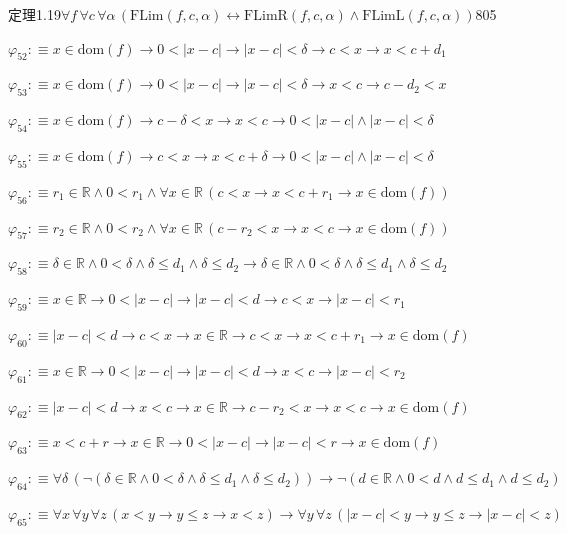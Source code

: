 \begin{fullproof}{定理1.19}{$\forall f\,\forall c\,\forall \alpha\,(\mathrm{FLim}(f,c,\alpha) \leftrightarrow \mathrm{FLimR}(f,c,\alpha) \land \mathrm{FLimL}(f,c,\alpha))$}{805}
\begin{abbrevlist}
\item $\varphi_{52} :\equiv x \in \mathrm{dom}(f) \to 0 < \lvert x - c \rvert \to \lvert x - c \rvert < \delta \to c < x \to x < c + d_{1}$
\item $\varphi_{53} :\equiv x \in \mathrm{dom}(f) \to 0 < \lvert x - c \rvert \to \lvert x - c \rvert < \delta \to x < c \to c - d_{2} < x$
\item $\varphi_{54} :\equiv x \in \mathrm{dom}(f) \to c - \delta < x \to x < c \to 0 < \lvert x - c \rvert \land \lvert x - c \rvert < \delta$
\item $\varphi_{55} :\equiv x \in \mathrm{dom}(f) \to c < x \to x < c + \delta \to 0 < \lvert x - c \rvert \land \lvert x - c \rvert < \delta$
\item $\varphi_{56} :\equiv r_{1} \in \mathbb{R} \land 0 < r_{1} \land \forall x \in \mathbb{R}\,(c < x \to x < c + r_{1} \to x \in \mathrm{dom}(f))$
\item $\varphi_{57} :\equiv r_{2} \in \mathbb{R} \land 0 < r_{2} \land \forall x \in \mathbb{R}\,(c - r_{2} < x \to x < c \to x \in \mathrm{dom}(f))$
\item $\varphi_{58} :\equiv \delta \in \mathbb{R} \land 0 < \delta \land \delta \leq d_{1} \land \delta \leq d_{2} \to \delta \in \mathbb{R} \land 0 < \delta \land \delta \leq d_{1} \land \delta \leq d_{2}$
\item $\varphi_{59} :\equiv x \in \mathbb{R} \to 0 < \lvert x - c \rvert \to \lvert x - c \rvert < d \to c < x \to \lvert x - c \rvert < r_{1}$
\item $\varphi_{60} :\equiv \lvert x - c \rvert < d \to c < x \to x \in \mathbb{R} \to c < x \to x < c + r_{1} \to x \in \mathrm{dom}(f)$
\item $\varphi_{61} :\equiv x \in \mathbb{R} \to 0 < \lvert x - c \rvert \to \lvert x - c \rvert < d \to x < c \to \lvert x - c \rvert < r_{2}$
\item $\varphi_{62} :\equiv \lvert x - c \rvert < d \to x < c \to x \in \mathbb{R} \to c - r_{2} < x \to x < c \to x \in \mathrm{dom}(f)$
\item $\varphi_{63} :\equiv x < c + r \to x \in \mathbb{R} \to 0 < \lvert x - c \rvert \to \lvert x - c \rvert < r \to x \in \mathrm{dom}(f)$
\item $\varphi_{64} :\equiv \forall \delta\,(\neg (\delta \in \mathbb{R} \land 0 < \delta \land \delta \leq d_{1} \land \delta \leq d_{2})) \to \neg (d \in \mathbb{R} \land 0 < d \land d \leq d_{1} \land d \leq d_{2})$
\item $\varphi_{65} :\equiv \forall x\,\forall y\,\forall z\,(x < y \to y \leq z \to x < z) \to \forall y\,\forall z\,(\lvert x - c \rvert < y \to y \leq z \to \lvert x - c \rvert < z)$

\end{abbrevlist}
\end{fullproof}
